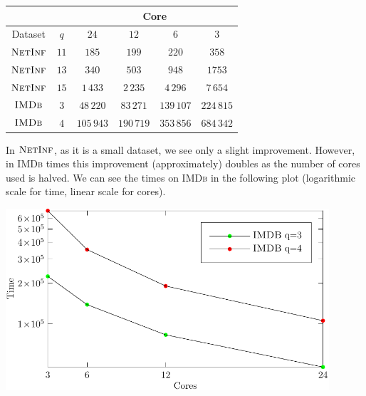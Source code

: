 \begin{table}[h]
	\centering
	\begin{tabular}{|c|c|c|c|c|c|}
		\cline{3-6}
		\multicolumn{2}{c}{} & \multicolumn{4}{|c|}{ Core } \\ 
		\hline
		Dataset           & $q$  & $24$       & $12$       & $6$        & $3$        \\  \hline \hline
		$\textsc{NetInf}$ & $11$ & $185$      & $199$      & $220$      & $358$      \\  \hline
		$\textsc{NetInf}$ & $13$ & $340$      & $503$      & $948$      & $1753$     \\  \hline
		$\textsc{NetInf}$ & $15$ & $1\,433$   & $2\,235$   & $4\,296$   & $7\,654$   \\  \hline \hline
		$\textsc{IMDb}$   & $3$  & $48\,220$  & $83\,271$  & $139\,107$ & $224\,815$ \\  \hline
		$\textsc{IMDb}$   & $4$  & $105\,943$ & $190\,719$ & $353\,856$ & $684\,342$ \\  \hline
		
	\end{tabular}
\end{table}

In $\textsc{NetInf}$, as it is a small dataset, we see only a slight improvement. 
However, in \textsc{IMDb} times this improvement (approximately) doubles as the number of cores used is halved.
We can see the times on \textsc{IMDb} in the following plot (logarithmic scale for time, linear scale for cores).\bigskip

\begin{minipage}[h]{0.9\textwidth}
 \centering
 \includegraphics[width=0.9\textwidth]{figure/figure-4-1}
\end{minipage}

\clearpage